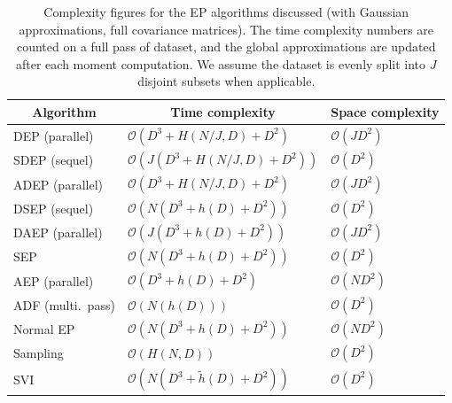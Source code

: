 \begin{table}[t]
\caption{Complexity figures for the EP algorithms discussed (with Gaussian approximations, full covariance matrices). The time complexity numbers are counted on a full pass of dataset, and the global approximations are updated after each moment computation. We assume the dataset is evenly split into $J$ disjoint subsets when applicable.}
\label{table:chap3_sep_complexity}
\begin{center}
\begin{tabular}{lll}
\multicolumn{1}{c}{\bf Algorithm}  &\multicolumn{1}{c}{\bf Time complexity} &\multicolumn{1}{c}{\bf Space complexity}
\\ \hline 
DEP (parallel)        	&$\mathcal{O}(D^3 + H(N/J, D) + D^2)$			&$\mathcal{O}(JD^2)$ \\
SDEP (sequel)        	&$\mathcal{O}(J(D^3 + H(N/J, D) + D^2))$			&$\mathcal{O}(D^2)$ \\
ADEP (parallel)        	&$\mathcal{O}(D^3 + H(N/J, D) + D^2)$			&$\mathcal{O}(JD^2)$ \\
DSEP (sequel)          &$\mathcal{O}(N(D^3 + h(D) + D^2))$ 		&$\mathcal{O}(D^2)$ \\
DAEP (parallel)         &$\mathcal{O}(J(D^3 + h(D) + D^2))$ 		&$\mathcal{O}(JD^2)$ \\
\hline
SEP 			         &$\mathcal{O}(N(D^3 + h(D) + D^2))$ 		&$\mathcal{O}(D^2)$ \\
AEP (parallel)		         &$\mathcal{O}(D^3 + h(D) + D^2)$ 		&$\mathcal{O}(ND^2)$ \\
ADF (multi.~pass) 		&$\mathcal{O}(N(h(D)))$ 		&$\mathcal{O}(D^2)$ \\
Normal EP         		&$\mathcal{O}(N(D^3 + h(D) + D^2))$ 		&$\mathcal{O}(ND^2)$ \\
\hline
Sampling 				&$\mathcal{O}(H(N, D))$			&$\mathcal{O}(D^2)$ \\
SVI 					&$\mathcal{O}(N(D^3 + \tilde{h}(D) + D^2))$	&$ \mathcal{O}(D^2)$ 
\end{tabular}
\end{center}
\end{table}

